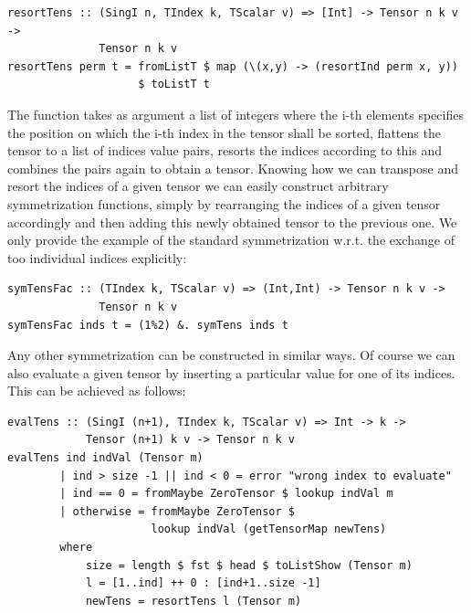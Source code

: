 \documentclass[a4paper,12pt, DIV=14, BCOR=5mm, twoside, headsepline]{scrbook}
\begin{document}
\begin{samepage} 
\begin{verbatim}
resortTens :: (SingI n, TIndex k, TScalar v) => [Int] -> Tensor n k v ->
              Tensor n k v 
resortTens perm t = fromListT $ map (\(x,y) -> (resortInd perm x, y))
                    $ toListT t 
\end{verbatim} 
\end{samepage}

The function takes as argument a list of integers where the i-th elements specifies the position on which the i-th index in the tensor shall be sorted, flattens the tensor to a list of indices value pairs, resorts the indices according to this and combines the pairs again to obtain a tensor. 
Knowing how we can transpose and resort the indices of a given tensor we can easily construct arbitrary symmetrization functions, simply by rearranging the indices of a given tensor accordingly and then adding this newly obtained tensor to the previous one. We only provide the example of the standard symmetrization w.r.t. the exchange of too individual indices explicitly:

\begin{samepage} 
\begin{verbatim}
symTensFac :: (TIndex k, TScalar v) => (Int,Int) -> Tensor n k v ->
              Tensor n k v 
symTensFac inds t = (1%2) &. symTens inds t
\end{verbatim} 
\end{samepage}

Any other symmetrization can be constructed in similar ways.
Of course we can also evaluate a given tensor by inserting a particular value for one of its indices. This can be achieved as follows:

\begin{samepage} 
\begin{verbatim}
evalTens :: (SingI (n+1), TIndex k, TScalar v) => Int -> k ->
            Tensor (n+1) k v -> Tensor n k v 
evalTens ind indVal (Tensor m)
        | ind > size -1 || ind < 0 = error "wrong index to evaluate" 
        | ind == 0 = fromMaybe ZeroTensor $ lookup indVal m
        | otherwise = fromMaybe ZeroTensor $
                      lookup indVal (getTensorMap newTens)
        where 
            size = length $ fst $ head $ toListShow (Tensor m)
            l = [1..ind] ++ 0 : [ind+1..size -1]
            newTens = resortTens l (Tensor m)
\end{verbatim} 
\end{samepage}
\end{document}
